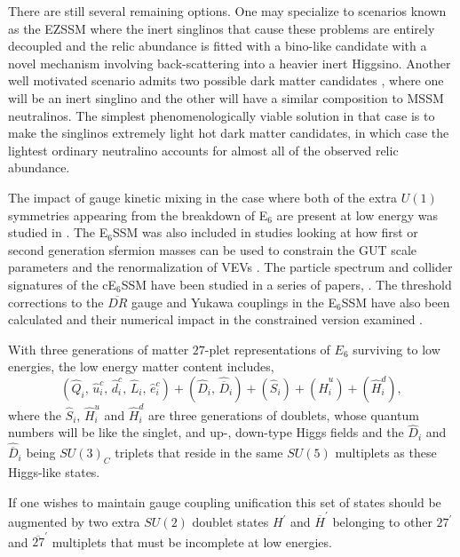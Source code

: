 \documentclass[preprint,amsmath,amssymb,aps,superscriptaddress,prd,showpacs,floatfix,nofootinbib]{revtex4-1}
\newcommand{\be}{\begin{equation}}
\newcommand{\ee}{\end{equation}}
\begin{document}
There are still several remaining options. One may specialize to
scenarios known as the EZSSM \cite{Hall:2011zq} where the inert
singlinos that cause these problems are entirely decoupled and the
relic abundance is fitted with a bino-like candidate with a novel
mechanism involving back-scattering into a heavier inert
Higgsino. Another well motivated scenario admits two possible dark
matter candidates \cite{Nevzorov:2012hs}, where one will be an inert
singlino and the other will have a similar composition to MSSM
neutralinos. The simplest phenomenologically viable solution in that
case is to make the singlinos extremely light hot dark matter
candidates, in which case the lightest ordinary neutralino accounts
for almost all of the observed relic abundance.

The impact of gauge kinetic mixing in the case where both of the extra
$U(1)$ symmetries appearing from the breakdown of E$_6$ are present at
low energy was studied in \cite{Rizzo:2012rf}.  The E$_6$SSM was also
included in studies looking at how first or second generation sfermion
masses can be used to constrain the GUT scale parameters
\cite{Miller:2012vn} and the renormalization of VEVs
\cite{Sperling:2013eva, Sperling:2013xqa}.  The particle spectrum and
collider signatures of the cE$_6$SSM have been studied in a series of
papers,
\cite{Athron:2009ue,Athron:2009bs,Athron:2011wu,Athron:2012sq}. The
threshold corrections to the $\overline{DR}$ gauge and Yukawa
couplings in the E$_6$SSM have also been calculated and their
numerical impact in the constrained version examined
\cite{Athron:2012pw}.


With three generations of matter $27$-plet representations of $E_6$
surviving to low energies, the low energy matter content includes, \be
(\hat{Q}_i,\,\hat{u}^c_i,\,\hat{d}^c_i,\,\hat{L}_i,\,\hat{e}^c_i)
+(\hat{D}_i,\,\hat{\overline{D}}_i)+(\hat{S}_{i})+(\hat{H}^u_i)+(\hat{H}^d_i),\ee
where the $\hat{S}_{i}$, $\hat{H}^u_i$ and $\hat{H}^d_i$ are three
generations of doublets, whose quantum numbers will be like the
singlet, and up-, down-type Higgs fields and the $\hat{D}_i$ and
$\hat{\overline{D}}_i$ being $SU(3)_C$ triplets that reside in the
same $SU(5)$ multiplets as these Higgs-like states.

If one wishes to maintain gauge coupling unification this set of
states should be augmented by two extra $SU(2)$ doublet states
$H^\prime$ and $\overline{H}^\prime$ belonging to other $27^\prime$
and $\overline{27}^\prime$ multiplets that must be incomplete at low
energies.
\end{document}
